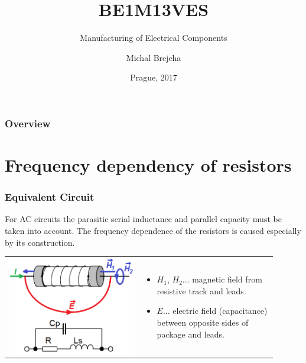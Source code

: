 \documentclass{beamer}
\title[BE1M13VES]{BE1M13VES}
\subtitle[Manufacturing of Electrical Components] {Manufacturing of Electrical Components}
\author[Brejcha]{Michal Brejcha}
\institute[CTU]{CTU in Prague}
\date[Prague, 2017]{Prague, 2017}
\begin{document}
\frame{\titlepage}

\begin{frame}
\frametitle{Overview} 
\tableofcontents
\end{frame}


\section{\texorpdfstring{Frequency dependency of resistors}{Frequency dependency of resistors}}
	\begin{frame}
    \frametitle{Equivalent Circuit}
		
		For AC circuits the parasitic serial inductance and parallel capacity must be taken into account. The frequency dependence of the resistors is caused especially by its construction.
		\begin{center}
			\begin{tabular}{m{0.45\linewidth} m{0.45\linewidth}}
			\includegraphics[scale=0.4]{obr01_poleRes.png} &
			
			\begin{itemize}
				\item $H_1$, $H_2$... magnetic field from resistive track and leads.
				\item $E$... electric field (capacitance) between opposite sides of package and leads.
			\end{itemize}
			\end{tabular}
		\end{center}
	\end{frame}
\end{document}
